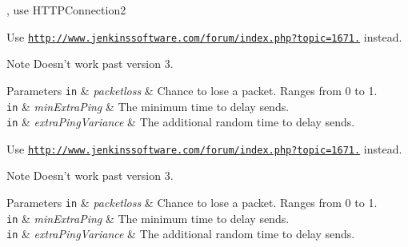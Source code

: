 
\begin{DoxyRefList}
\item[\label{deprecated__deprecated000001}%
\hypertarget{deprecated__deprecated000001}{}%
Class \hyperlink{class_rak_net_1_1_h_t_t_p_connection}{Rak\-Net\-:\-:H\-T\-T\-P\-Connection} ], use H\-T\-T\-P\-Connection2  
\item[\label{deprecated__deprecated000002}%
\hypertarget{deprecated__deprecated000002}{}%
Member \hyperlink{class_rak_net_1_1_rak_peer_a38a4348d90eb454b4d470d45fb19b99e}{Rak\-Net\-:\-:Rak\-Peer\-:\-:Apply\-Network\-Simulator} (float packetloss, unsigned short min\-Extra\-Ping, unsigned short extra\-Ping\-Variance)]Use \href{http://www.jenkinssoftware.com/forum/index.php?topic=1671.0}{\tt http\-://www.\-jenkinssoftware.\-com/forum/index.\-php?topic=1671.} instead. \begin{DoxyNote}{Note}
Doesn't work past version 3. 
\end{DoxyNote}

\begin{DoxyParams}[1]{Parameters}
\mbox{\tt in}  & {\em packetloss} & Chance to lose a packet. Ranges from 0 to 1. \\
\hline
\mbox{\tt in}  & {\em min\-Extra\-Ping} & The minimum time to delay sends. \\
\hline
\mbox{\tt in}  & {\em extra\-Ping\-Variance} & The additional random time to delay sends.  \\
\hline
\end{DoxyParams}

\item[\label{deprecated__deprecated000003}%
\hypertarget{deprecated__deprecated000003}{}%
Member \hyperlink{class_rak_net_1_1_rak_peer_interface_a03910361629f5cbabe0df0612a1f2709}{Rak\-Net\-:\-:Rak\-Peer\-Interface\-:\-:Apply\-Network\-Simulator} (float packetloss, unsigned short min\-Extra\-Ping, unsigned short extra\-Ping\-Variance)=0]Use \href{http://www.jenkinssoftware.com/forum/index.php?topic=1671.0}{\tt http\-://www.\-jenkinssoftware.\-com/forum/index.\-php?topic=1671.} instead. \begin{DoxyNote}{Note}
Doesn't work past version 3. 
\end{DoxyNote}

\begin{DoxyParams}[1]{Parameters}
\mbox{\tt in}  & {\em packetloss} & Chance to lose a packet. Ranges from 0 to 1. \\
\hline
\mbox{\tt in}  & {\em min\-Extra\-Ping} & The minimum time to delay sends. \\
\hline
\mbox{\tt in}  & {\em extra\-Ping\-Variance} & The additional random time to delay sends.  \\
\hline
\end{DoxyParams}


\end{DoxyRefList}
